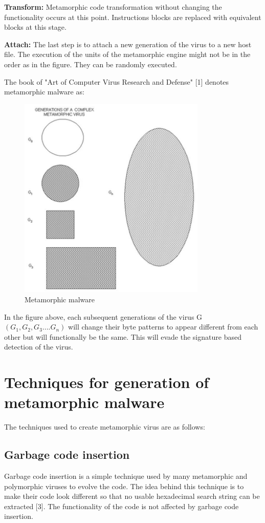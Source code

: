 \textbf{Transform:} Metamorphic code transformation without changing the functionality occurs at this point. Instructions blocks are replaced with equivalent blocks at this stage.

\textbf{Attach:} The last step is to attach a new generation of the virus to a new host file. The execution of the units of the metamorphic engine might not be in the order as in the figure. They can be randomly executed. 

The book of "Art of Computer Virus Research and Defense" [1] denotes metamorphic malware as:
\break
\begin{figure}[htb]
\centering
\includegraphics[width=0.8\textwidth]{images/metamorphic_malware.jpg}
\caption{Metamorphic malware} 
\label{fig:Metamorphic malware}
\end{figure}

In the figure above, each subsequent generations of the virus G $(G_1, G_2, G_3....G_n)$ will change their byte patterns to appear different from each other but will functionally be the same. This will evade the signature based detection of the virus. 
\pagebreak
\section{Techniques for generation of metamorphic malware}
The techniques used to create metamorphic virus are as follows:

\subsection{Garbage code insertion}
Garbage code insertion is a simple technique used by many metamorphic and polymorphic viruses to evolve the code. The idea behind this technique is to make their code look different so that no usable hexadecimal search string can be extracted [3]. The functionality of the code is not affected by garbage code insertion.

